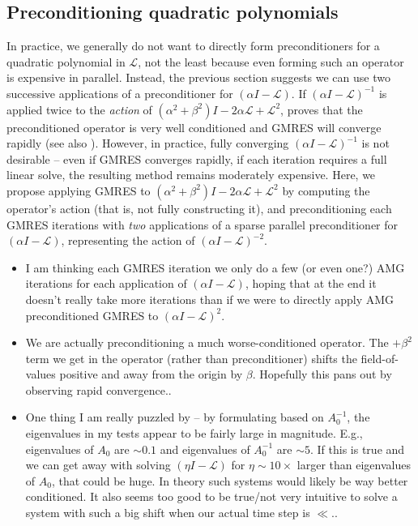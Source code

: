 \documentclass[a4paper,10pt]{article}
\begin{document}
\subsection{Preconditioning quadratic polynomials}

In practice, we generally do not want to directly form preconditioners for a quadratic
polynomial in $\mathcal{L}$, not the least because even forming such an operator is 
expensive in parallel. Instead, the previous section suggests we can use two successive 
applications of a preconditioner for $(\alpha I - \mathcal{L})$. If $(\alpha I - \mathcal{L})^{-1}$
is applied twice to the \textit{action} of $(\alpha^2+\beta^2)I - 2\alpha\mathcal{L} + \mathcal{L}^2$,
 proves that the preconditioned operator is very well conditioned and GMRES
will converge rapidly (see also ). However, in practice, fully converging
$(\alpha I - \mathcal{L})^{-1}$ is not desirable --  even if GMRES converges rapidly,
if each iteration requires a full linear solve, the resulting method remains moderately
expensive. 
Here, we propose applying GMRES to $(\alpha^2+\beta^2)I - 2\alpha\mathcal{L} + \mathcal{L}^2$
by computing the operator's action (that is, not fully constructing it), and preconditioning
each GMRES iterations with \textit{two} applications of a sparse parallel preconditioner for
$(\alpha I - \mathcal{L})$, representing the action of $(\alpha I - \mathcal{L})^{-2}$. 



{\color{blue}
\begin{itemize}
	\item I am thinking each GMRES iteration we only do a few (or even one?) AMG iterations
	for each application of $(\alpha I - \mathcal{L})$, hoping that at the end it doesn't
	really take more iterations than if we were to directly apply AMG preconditioned GMRES
	to $(\alpha I - \mathcal{L})^2$.

	\item We are actually preconditioning a much worse-conditioned operator. The $+\beta^2$
	term we get in the operator (rather than preconditioner) shifts the field-of-values 
	positive and away from the origin by $\beta$. Hopefully this pans out by observing
	rapid convergence..

	\item One thing I am really puzzled by -- by formulating based on $A_0^{-1}$, the
	eigenvalues in my tests appear to be fairly large in magnitude. E.g., eigenvalues of
	$A_0$ are $\sim 0.1$ and eigenvalues of $A_0^{-1}$ are $\sim 5$. If this is true and we
	can get away with solving $(\eta I -\mathcal{L})$ for $\eta \sim 10\times$ larger than
	eigenvalues of $A_0$, that could be huge. In theory such systems would likely be way
	better conditioned. It also seems too good to be true/not very intuitive to solve a
	system with such a big shift when our actual time step is $\ll$..

\end{itemize}
}
\end{document}
